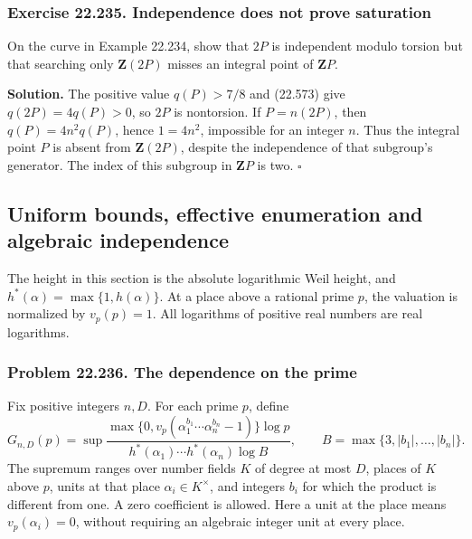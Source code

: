 \documentclass[
  11pt,
  a4paper,
]{article}
\begin{document}
\subsubsection{Exercise 22.235. Independence does not prove
saturation}\label{exercise-22.235.-independence-does-not-prove-saturation}

On the curve in Example 22.234, show that \(2P\) is independent modulo
torsion but that searching only \(\mathbf Z(2P)\) misses an integral
point of \(\mathbf ZP\).

\textbf{Solution.} The positive value \(q(P)>7/8\) and (22.573) give
\(q(2P)=4q(P)>0\), so \(2P\) is nontorsion. If \(P=n(2P)\), then
\(q(P)=4n^2q(P)\), hence \(1=4n^2\), impossible for an integer \(n\).
Thus the integral point \(P\) is absent from \(\mathbf Z(2P)\), despite
the independence of that subgroup's generator. The index of this
subgroup in \(\mathbf ZP\) is two. \(\square\)

\subsection{Uniform bounds, effective enumeration and algebraic
independence}\label{uniform-bounds-effective-enumeration-and-algebraic-independence}

The height in this section is the absolute logarithmic Weil height, and
\(h^*(\alpha)=\max\{1,h(\alpha)\}\). At a place above a rational prime
\(p\), the valuation is normalized by \(v_p(p)=1\). All logarithms of
positive real numbers are real logarithms.

\subsubsection{Problem 22.236. The dependence on the
prime}\label{problem-22.236.-the-dependence-on-the-prime}

Fix positive integers \(n,D\). For each prime \(p\), define \[
 G_{n,D}(p)=\sup
 \frac{\max\{0,v_p(\alpha_1^{b_1}\cdots\alpha_n^{b_n}-1)\}\log p}
 {h^*(\alpha_1)\cdots h^*(\alpha_n)\log B},
 \qquad B=\max\{3,|b_1|,\ldots,|b_n|\}.
 \tag{22.705}
\] The supremum ranges over number fields \(K\) of degree at most \(D\),
places of \(K\) above \(p\), units at that place
\(\alpha_i\in K^\times\), and integers \(b_i\) for which the product is
different from one. A zero coefficient is allowed. Here a unit at the
place means \(v_p(\alpha_i)=0\), without requiring an algebraic integer
unit at every place.
\end{document}
